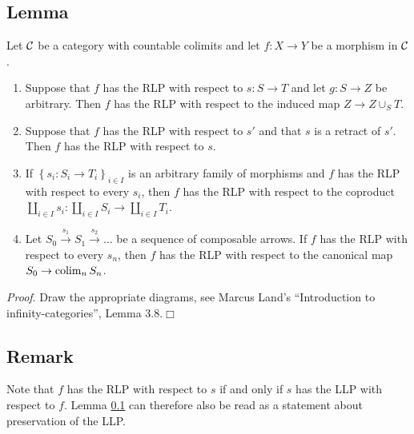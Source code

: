     \subsection{Lemma}\label{chV-2-2}
        Let $\mathcal{C}$ be a category with countable colimits and let $f \colon X \to Y$ be a morphism in $\mathcal{C}$.
        \begin{enumerate}[label=\roman*)]
            \item 
                Suppose that $f$ has the RLP with respect to $s \colon S \to T$ and let $g \colon S \to Z$ be arbitrary. Then $f$ has the RLP with respect to the induced map $Z \to Z \cup_S T$.
            \item 
                Suppose that $f$ has the RLP with respect to $s'$ and that $s$ is a retract of $s'$. Then $f$ has the RLP with respect to $s$.
            \item 
                If $\left\{ s_i \colon S_i \to T_i\right\}_{i \in I}$ is an arbitrary family of morphisms and $f$ has the RLP with respect to every $s_i$, then $f$ has the RLP with respect to the coproduct $\coprod_{i \in I}s_i \colon \coprod_{i \in I} S_i \to \coprod_{i \in I} T_i$.
            \item 
                Let $S_0 \xrightarrow{s_1} S_1 \xrightarrow{s_2} \ldots$ be a sequence of composable arrows. If $f$ has the RLP with respect to every $s_n$, then $f$ has the RLP with respect to the canonical map $S_0 \to \operatorname*{colim}_n S_n$.
        \end{enumerate}
        \smallskip

        \emph{Proof}. Draw the appropriate diagrams, see Marcus Land's ``Introduction to infinity-categories'', Lemma 3.8.\hfill$\Box$

    \subsection{Remark}\label{chV-2-3}
        Note that $f$ has the RLP with respect to $s$ if and only if $s$ has the LLP with respect to $f$. Lemma \ref{chV-2-2} can therefore also be read as a statement about preservation of the LLP.

